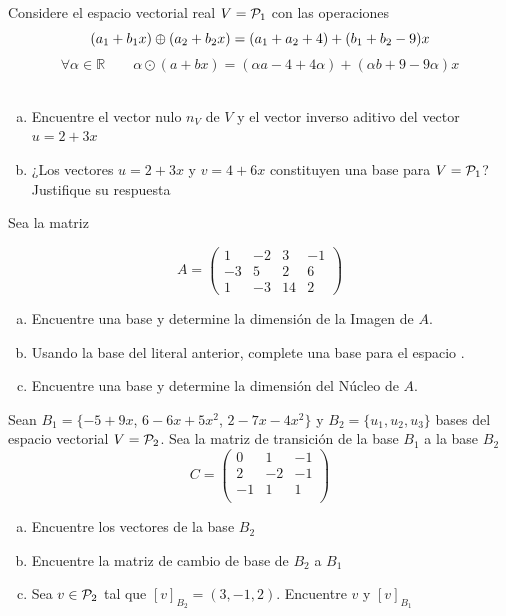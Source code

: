 \documentclass[10pt]{article}
\begin{document}
\problem{}
Considere el espacio vectorial real $V = {\cal P}_1$ con las operaciones 
\[(a_1 + b_1 x)\oplus (a_2 + b_2 x) = (a_1 + a_2 + 4) + (b_1 + b_2 - 9)x\]
\[\forall \alpha \in \mathbb{R}\qquad \alpha\odot(a + bx) = (\alpha a - 4 + 4\alpha) + (\alpha b + 9 - 9\alpha)x\]\
\begin{enumerate}[a.]
\item Encuentre el vector nulo $n_V$ de $V$ y el vector inverso aditivo del vector $u = 2 + 3x$
\item ¿Los vectores $u = 2 + 3x$ y $v = 4 + 6x$ constituyen una base para $V = {\cal P}_1$? Justifique su respuesta
\end{enumerate}

\problem{}
Sea la matriz

\[ A = \left( \begin{array}{rrrr}
1 & - 2 & 3 & - 1 \\
- 3 & 5 & 2 & 6 \\
1 & - 3 & 14 & 2 \end{array} \right)\] 
\begin{enumerate}[a.]
\item Encuentre una base y determine la dimensión de la Imagen de $A$.
\item Usando la base del literal anterior, complete una base para el espacio \rtres.
\item Encuentre una base y determine la dimensión del Núcleo de $A$.

\end{enumerate}

\problem{}
Sean $B_1 = \{-5 + 9x$, $6-6x+5x^2$, $2-7x-4x^2\}$ y $B_2 = \{u_1,u_2,u_3\}$ bases del espacio vectorial $V = {\cal P}_2$. Sea la matriz de transición de la base $B_1$ a la base $B_2$
\[C=\begin{pmatrix}

0 & 1 & -1 \\
2 & -2 & -1  \\
-1 & 1 & 1  \\

\end{pmatrix}\]

\begin{enumerate}[a.]
\item Encuentre los vectores de la base $B_2$
\item Encuentre la matriz de cambio de base de $B_2$ a $B_1$
\item Sea $v \in {\cal P}_2 $ tal que $[v]_{B_2} = (3,-1,2)$. Encuentre $v$ y $[v]_{B_1}$

\end{enumerate}
\end{document}
